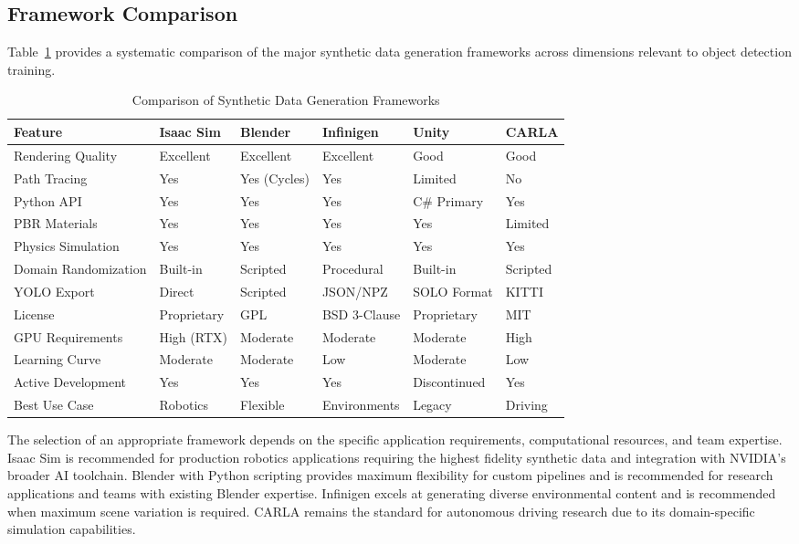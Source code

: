 \subsection{Framework Comparison}

Table~\ref{tab:framework_comparison} provides a systematic comparison of the major synthetic data generation frameworks across dimensions relevant to object detection training.

\begin{table}[htbp]
\centering
\caption{Comparison of Synthetic Data Generation Frameworks}
\label{tab:framework_comparison}
\begin{tabular}{p{2.5cm}p{2cm}p{2cm}p{2cm}p{2cm}p{2cm}}
\hline
\textbf{Feature} & \textbf{Isaac Sim} & \textbf{Blender} & \textbf{Infinigen} & \textbf{Unity} & \textbf{CARLA} \\
\hline
Rendering Quality & Excellent & Excellent & Excellent & Good & Good \\
Path Tracing & Yes & Yes (Cycles) & Yes & Limited & No \\
Python API & Yes & Yes & Yes & C\# Primary & Yes \\
PBR Materials & Yes & Yes & Yes & Yes & Limited \\
Physics Simulation & Yes & Yes & Yes & Yes & Yes \\
Domain Randomization & Built-in & Scripted & Procedural & Built-in & Scripted \\
YOLO Export & Direct & Scripted & JSON/NPZ & SOLO Format & KITTI \\
License & Proprietary & GPL & BSD 3-Clause & Proprietary & MIT \\
GPU Requirements & High (RTX) & Moderate & Moderate & Moderate & High \\
Learning Curve & Moderate & Moderate & Low & Moderate & Low \\
Active Development & Yes & Yes & Yes & Discontinued & Yes \\
Best Use Case & Robotics & Flexible & Environments & Legacy & Driving \\
\hline
\end{tabular}
\end{table}

The selection of an appropriate framework depends on the specific application requirements, computational resources, and team expertise. Isaac Sim is recommended for production robotics applications requiring the highest fidelity synthetic data and integration with NVIDIA's broader AI toolchain. Blender with Python scripting provides maximum flexibility for custom pipelines and is recommended for research applications and teams with existing Blender expertise. Infinigen excels at generating diverse environmental content and is recommended when maximum scene variation is required. CARLA remains the standard for autonomous driving research due to its domain-specific simulation capabilities.

